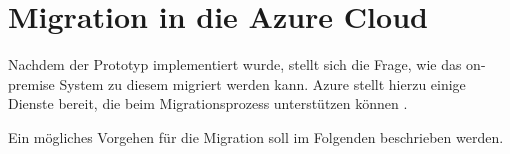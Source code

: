 \section{Migration in die Azure Cloud} \label{sec:praktischeUmsetzung:Migration}
Nachdem der Prototyp implementiert wurde, stellt sich die Frage, wie das on-premise System zu diesem migriert werden kann. Azure stellt hierzu einige Dienste bereit, die beim Migrationsprozess unterstützen können \cite{chilberto_building_2020}. 

Ein mögliches Vorgehen für die Migration soll im Folgenden beschrieben werden.